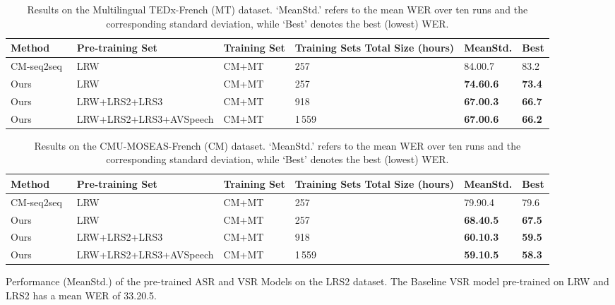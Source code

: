 \documentclass[twocolumn]{article}
\begin{document}
\begin{table*}[!t]
\begin{tabularx}{2\columnwidth}{j v k o y y}
\bottomrule
\end{tabularx}
\label{tab: supplemental_CMportuguese_results}
\end{table*} \begin{table*}[!t]
\centering
\caption{Results on the Multilingual TEDx-French (MT) dataset. `MeanStd.' refers to the mean WER over ten runs and the corresponding standard deviation, while `Best' denotes the best (lowest) WER.}
\renewcommand\arraystretch{1.4}
\begin{tabularx}{2\columnwidth}{j v k o y y}
\toprule
Method &Pre-training Set &Training Set &Training Sets Total Size (hours) &MeanStd. &Best \\
\midrule
CM-seq2seq~\cite{DBLP:journals/corr/abs-2102-06657} &LRW &CM+MT &257 & 84.00.7 & 83.2 \\
\midrule
Ours &LRW &CM+MT &257 &\bf 74.60.6 &\bf 73.4 \\
\midrule
Ours &LRW+LRS2+LRS3 &CM+MT &918 &\bf 67.00.3 &\bf 66.7 \\
\midrule
Ours &LRW+LRS2+LRS3+AVSpeech &CM+MT &1\,559 &\bf 67.00.6 &\bf 66.2 \\
\bottomrule
\end{tabularx}
\label{tab: supplemental_MTfrench_results}
\end{table*} \begin{table*}[!t]
\centering
    \caption{Results on the CMU-MOSEAS-French (CM) dataset. `MeanStd.' refers to the mean WER over ten runs and the corresponding standard deviation, while `Best' denotes the best (lowest) WER.}
\renewcommand\arraystretch{1.4}
\begin{tabularx}{2\columnwidth}{j v k o y y}
\toprule
Method &Pre-training Set &Training Set &Training Sets Total Size (hours) &MeanStd. &Best \\
\midrule
CM-seq2seq~\cite{DBLP:journals/corr/abs-2102-06657} &LRW &CM+MT &257 & 79.90.4 & 79.6 \\
\midrule
Ours &LRW &CM+MT &257 &\bf 68.40.5 &\bf 67.5 \\
\midrule
Ours &LRW+LRS2+LRS3 &CM+MT &918 &\bf 60.10.3 &\bf 59.5 \\
\midrule
Ours &LRW+LRS2+LRS3+AVSpeech &CM+MT &1\,559 &\bf 59.10.5 &\bf 58.3 \\
\bottomrule
\end{tabularx}
\label{tab: supplemental_CMfrench_results}
\end{table*} \begin{table*}[!t]
\caption{Performance (MeanStd.) of the pre-trained ASR and VSR Models on the LRS2 dataset. The Baseline VSR model pre-trained on LRW and LRS2 has a mean WER of 33.20.5.}

\end{table*}
\end{document}
